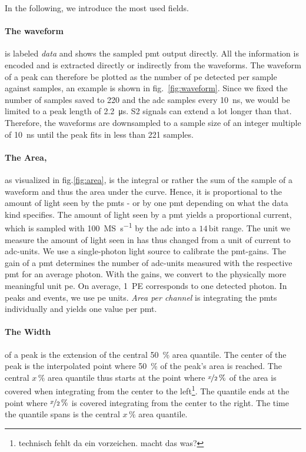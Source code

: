 In the following, we introduce the most used fields.

\paragraph{The waveform} is labeled \emph{data} and shows the sampled \gls{pmt} output directly.
All the information is encoded and is extracted directly or indirectly from the waveforms.
The waveform of a peak can therefore be plotted as the number of \gls{pe} detected per sample against samples, an example is shown in fig.~\ref{fig:waveform}.
Since we fixed the number of samples saved to 220 and the \gls{adc} samples every \SI{10}{\nano\second}, we would be limited to a peak length of \SI{2.2}{\micro\second}.
S2 signals can extend a lot longer than that.
Therefore, the waveforms are downsampled to a sample size of an integer multiple of \SI{10}{\nano\second} until the peak fits in less than 221 samples.

\paragraph{The Area,} as visualized in fig.\ref{fig:area}, is the integral or rather the sum of the sample of a waveform and thus the area under the curve.
Hence, it is proportional to the amount of light seen by the \glspl{pmt} - or by one \gls{pmt} depending on what the data kind specifies.
The amount of light seen by a \gls{pmt} yields a proportional current, which is sampled with \SI{100}{\mega S\per\second} by the \gls{adc} into a $ 14\,\mathrm{bit} $ range.
The unit we measure the amount of light seen in has thus changed from a unit of current to \gls{adc}-units.
We use a single-photon light source to calibrate the \gls{pmt}-gains.
The gain of a \gls{pmt} determines the number of \gls{adc}-units measured with the respective \gls{pmt} for an average photon.
With the gains, we convert to the physically more meaningful unit \gls{pe}.
On average, \SI{1}{PE} corresponds to one detected photon.
In peaks and events, we use \gls{pe} units.
\emph{Area per channel} is integrating the \glspl{pmt} individually and yields one value per \gls{pmt}.

\paragraph{The Width} of a peak is the extension of the central \SI{50}{\%} area quantile.
The center of the peak is the interpolated point where \SI{50}{\%} of the peak's area is reached.
The central $ x\,\% $ area quantile thus starts at the point where $ \nicefrac{x}{2}\,\% $ of the area is covered when integrating from the center to the left\footnote{technisch fehlt da ein vorzeichen. macht das was?}.
The quantile ends at the point where $ \nicefrac{x}{2}\,\% $ is covered integrating from the center to the right.
The time the quantile spans is the central $ x\,\% $ area quantile.

